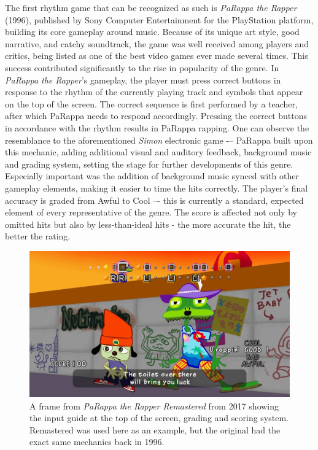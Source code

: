The first rhythm game that can be recognized as such is \textit{PaRappa the Rapper} (1996), published by Sony Computer Entertainment for the PlayStation platform, building its core gameplay around music. Because of its unique art style, good narrative, and catchy soundtrack, the game was well received among players and critics, being listed as one of the best video games ever made several times. \cite{acclaimed_videogames_parappa} This success contributed significantly to the rise in popularity of the genre. In \textit{PaRappa the Rapper}'s gameplay, the player must press correct buttons in response to the rhythm of the currently playing track and symbols that appear on the top of the screen. The correct sequence is first performed by a teacher, after which PaRappa needs to respond accordingly. Pressing the correct buttons in accordance with the rhythm results in PaRappa rapping. One can observe the resemblance to the aforementioned \textit{Simon} electronic game -– PaRappa built upon this mechanic, adding additional visual and auditory feedback, background music and grading system, setting the stage for further developments of this genre. Especially important was the addition of background music synced with other gameplay elements, making it easier to time the hits correctly. The player's final accuracy is graded from Awful to Cool –- this is currently a standard, expected element of every representative of the genre. The score is affected not only by omitted hits but also by less-than-ideal hits - the more accurate the hit, the better the rating.

\begin{figure}[h]
    \centering\includegraphics[scale=0.25]{obrazki/parappatherapper.jpg}
    \caption{A frame from \textit{PaRappa the Rapper Remastered} from 2017 showing the input guide at the top of the screen, grading and scoring system. Remastered was used here as an example, but the original had the exact same mechanics back in 1996. \cite{parappatherapper}}
    \label{fig:parappa_the_rapper}
\end{figure}

